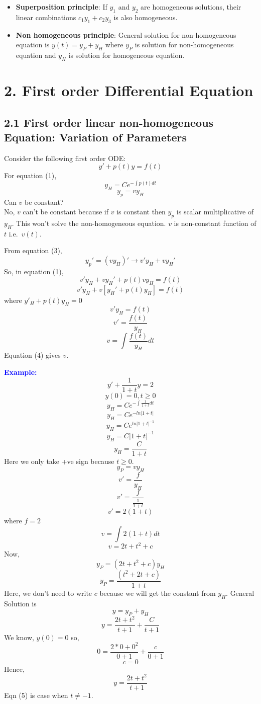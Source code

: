 \documentclass[
  11pt,
]{article}
\providecommand{\tightlist}{%
  \setlength{\itemsep}{0pt}\setlength{\parskip}{0pt}}
\begin{document}
\begin{itemize}
\tightlist
\item
  \textbf{Superposition principle}: If \(y_1\) and \(y_2\) are
  homogeneous solutions, their linear combinations \(c_1y_1 + c_2y_3\)
  is also homogeneous.
\item
  \textbf{Non homogeneous principle}: General solution for
  non-homogeneous equation is \(y(t) = y_P + y_H\) where \(y_P\) is
  solution for non-homogeneous equation and \(y_H\) is solution for
  homogeneous equation.
\end{itemize}

\newpage

\section{2. First order Differential
Equation}\label{first-order-differential-equation}

\subsection{2.1 First order linear non-homogeneous Equation: Variation
of
Parameters}\label{first-order-linear-non-homogeneous-equation-variation-of-parameters}

Consider the following first order ODE: \[y'+p(t)y=f(t) \tag{1}\] For
equation (1), \[y_H=Ce^{-\int{p(t)dt}} \tag{2}\] \[y_p=vy_H \tag{3}\]
Can \(v\) be constant?\\
No, \(v\) can't be constant because if \(v\) is constant then \(y_p\) is
scalar multiplicative of \(y_H\). This won't solve the non-homogeneous
equation. \(v\) is non-constant function of \(t\) i.e.~\(v(t)\).

From equation (3), \[y_p'=(vy_H)' \longrightarrow v'y_H+vy_H'\] So, in
equation (1), \[v'y_H+vy_H'+p(t)vy_H=f(t)\]
\[v'y_H+v[y_H'+p(t)y_H]=f(t)\] where \(y'_H+p(t)y_H=0\) \[v'y_H=f(t)\]
\[v'=\frac{f(t)}{y_H}\] \[v=\int\frac{f(t)}{y_H}dt \tag{4}\] Equation
(4) gives \(v\).

\textbf{\textcolor{blue}{Example:}} \[y'+\frac{1}{1+t}y=2\]
\[y(0)=0, t\geq0\] \[y_H=Ce^{-\int\frac{1}{1+t}dt}\]
\[y_H=Ce^{-ln|1+t|}\] \[y_H=Ce^{ln|1+t|^{-1}}\] \[y_H=C|1+t|^{-1}\]
\[y_H=\frac{C}{1+t} \tag{1}\] Here we only take +ve sign because
\(t\geq0\). \[y_P=vy_H\] \[v'=\frac{f}{y_H}\]
\[v'=\frac{f}{\frac{1}{1+t}}\] \[v'=2(1+t)\] where \(f=2\)
\[v=\int{2(1+t)}dt\] \[v=2t+t^2+c \tag{2}\] Now, \[y_P=(2t+t^2+c)y_H\]
\[y_P=\frac{(t^2+2t+c)}{1+t} \tag{3}\] Here, we don't need to write
\(c\) because we will get the constant from \(y_H\). General Solution is
\[y=y_P+y_H\] \[y=\frac{2t+t^2}{t+1}+\frac{C}{t+1} \tag{4}\] We know,
\(y(0)=0\) so, \[0=\frac{2*0+0^2}{0+1}+\frac{c}{0+1}\] \[c=0\] Hence,
\[y=\frac{2t+t^2}{t+1} \tag{5}\] Eqn (5) is case when \(t\neq-1\).
\end{document}
